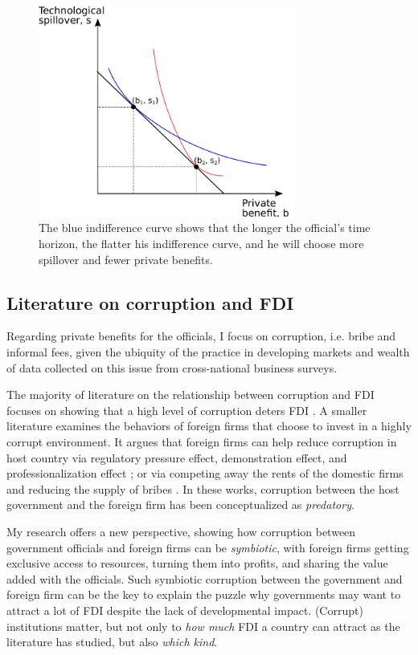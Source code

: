 \begin{figure}[!ht]
	\centering
    \includegraphics[width=0.75\textwidth, height=0.75\textheight,keepaspectratio]{../figure/indifference_curve}
    \caption{The blue indifference curve shows that the longer the official's time horizon, the flatter his indifference curve, and he will choose more spillover and fewer private benefits.}
    \label{fig:indifference_curve}
\end{figure}

\subsection{Literature on corruption and FDI}
\label{sec:theory_literature_review}

Regarding private benefits for the officials, I focus on corruption, i.e. bribe and informal fees, given the ubiquity of the practice in developing markets and wealth of data collected on this issue from cross-national business surveys. 

The majority of literature on the relationship between corruption and FDI focuses on showing that a high level of corruption deters FDI \citep{Wei2000, Hakkala2008, Al-Sadig2009}. A smaller literature examines the behaviors of foreign firms that choose to invest in a highly corrupt environment. It argues that foreign firms can help reduce corruption in host country via regulatory pressure effect, demonstration effect, and professionalization effect \citep{Kwok2006}; or via competing away the rents of the domestic firms and reducing the supply of bribes \citep{Sandholtz2003}. In these works, corruption between the host government and the foreign firm has been conceptualized as \textit{predatory}.

My research offers a new perspective, showing how corruption between government officials and foreign firms can be \textit{symbiotic}, with foreign firms getting exclusive access to resources, turning them into profits, and sharing the value added with the officials. Such symbiotic corruption between the government and foreign firm can be the key to explain the puzzle why governments may want to attract a lot of FDI despite the lack of developmental impact. (Corrupt) institutions matter, but not only to \textit{how much} FDI a country can attract as the literature has studied, but also \textit{which kind}.